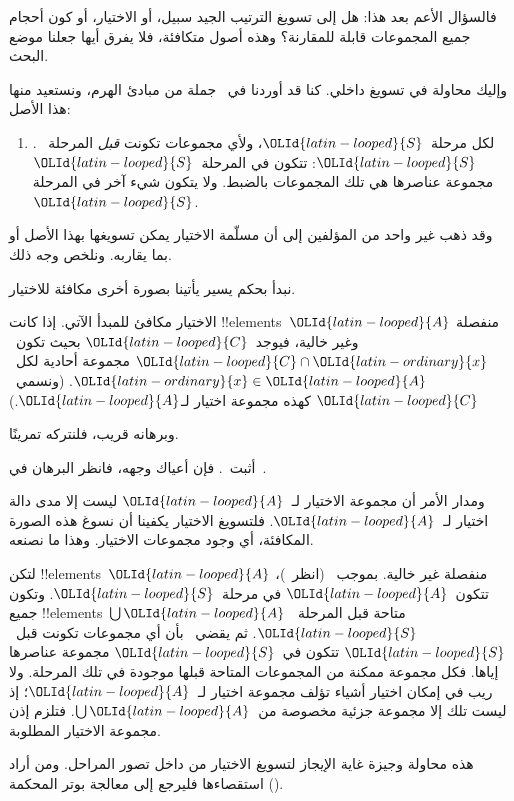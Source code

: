 \documentclass[../../../include/open-logic-section]{subfiles}
\begin{document}

فالسؤال الأعم بعد هذا: هل إلى تسويغ الترتيب الجيد سبيل، أو الاختيار،
أو كون أحجام جميع المجموعات قابلة للمقارنة؟ وهذه أصول متكافئة، فلا
يفرق أيها جعلنا موضع البحث.

وإليك محاولة في تسويغ داخلي. كنا قد أوردنا في~
جملة من مبادئ الهرم، ونستعيد منها هذا الأصل:
\begin{enumerate}
	\item[] \stagesacc. لكل مرحلة~$\OLId{latin-looped}{S}$، ولأي مجموعات تكونت
	\emph{قبل} المرحلة~$\OLId{latin-looped}{S}$: تتكون في المرحلة~$\OLId{latin-looped}{S}$ مجموعة عناصرها هي تلك
	المجموعات بالضبط. ولا يتكون شيء آخر في المرحلة~$\OLId{latin-looped}{S}$.
\end{enumerate}
وقد ذهب غير واحد من المؤلفين إلى أن مسلّمة الاختيار يمكن تسويغها بهذا
الأصل أو بما يقاربه. ونلخص وجه ذلك.

نبدأ بحكم يسير يأتينا بصورة أخرى مكافئة للاختيار.

\begin{thm}[في $\ZF$]
الاختيار مكافئ للمبدأ الآتي. إذا كانت !!{element}s~$\OLId{latin-looped}{A}$ منفصلة وغير
خالية، فيوجد~$\OLId{latin-looped}{C}$ بحيث تكون~$\OLId{latin-looped}{C} \cap \OLId{latin-ordinary}{x}$ مجموعة أحادية لكل~$\OLId{latin-ordinary}{x} \in \OLId{latin-looped}{A}$.
(ونسمي~$\OLId{latin-looped}{C}$ كهذه {مجموعة اختيار} لـ$\OLId{latin-looped}{A}$.)
\end{thm}

وبرهانه قريب، فلنتركه تمرينًا.

\begin{prob}
أثبت~. فإن أعياك وجهه،
فانظر البرهان في~\cite[pp.~242--3]{Potter2004}.
\end{prob}

ومدار الأمر أن مجموعة الاختيار لـ~$\OLId{latin-looped}{A}$ ليست إلا مدى دالة اختيار
لـ~$\OLId{latin-looped}{A}$. فلتسويغ الاختيار يكفينا أن نسوغ هذه الصورة المكافئة، أي وجود
مجموعات الاختيار. وهذا ما نصنعه.

لتكن !!{element}s~$\OLId{latin-looped}{A}$ منفصلة غير خالية. بموجب~\stageshier{}
(انظر~)، تتكون~$\OLId{latin-looped}{A}$ في مرحلة~$\OLId{latin-looped}{S}$. وتكون جميع
!!{element}s~$\bigcup \OLId{latin-looped}{A}$ متاحة قبل المرحلة~$\OLId{latin-looped}{S}$. ثم يقضي~\stagesacc{}
بأن أي مجموعات تكونت قبل~$\OLId{latin-looped}{S}$ تتكون في~$\OLId{latin-looped}{S}$ مجموعة عناصرها إياها. فكل
مجموعة ممكنة من المجموعات المتاحة قبلها موجودة في تلك المرحلة. ولا ريب في
إمكان اختيار أشياء تؤلف مجموعة اختيار لـ~$\OLId{latin-looped}{A}$؛ إذ ليست تلك إلا مجموعة
جزئية مخصوصة من~$\bigcup \OLId{latin-looped}{A}$. فتلزم إذن مجموعة الاختيار المطلوبة.

هذه محاولة وجيزة غاية الإيجاز لتسويغ الاختيار من داخل تصور المراحل.
ومن أراد استقصاءها فليرجع إلى معالجة بوتر المحكمة
(\citeyear[\S14.8]{Potter2004}).
\end{document}

